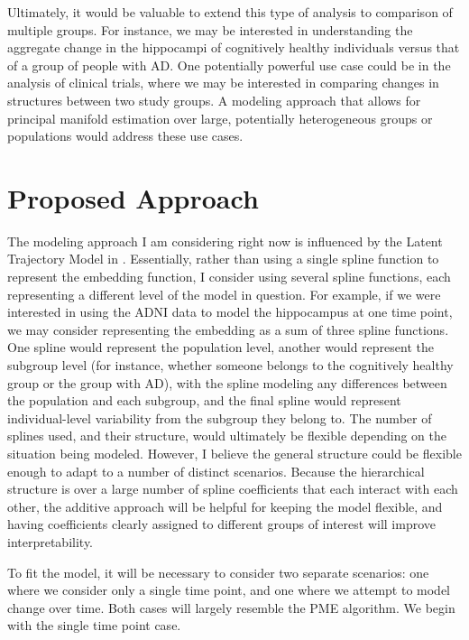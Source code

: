 \documentclass[11pt, reqno]{article}
\begin{document}
Ultimately, it would be valuable to extend this type of analysis to comparison of multiple groups. For instance, we may be interested in understanding the aggregate change in the hippocampi of cognitively healthy individuals versus that of a group of people with AD. One potentially powerful use case could be in the analysis of clinical trials, where we may be interested in comparing changes in structures between two study groups. A modeling approach that allows for principal manifold estimation over large, potentially heterogeneous groups or populations would address these use cases.

\section{Proposed Approach}

The modeling approach I am considering right now is influenced by the Latent Trajectory Model in \cite{schulamIntegrativeAnalysisUsing2016}. Essentially, rather than using a single spline function to represent the embedding function, I consider using several spline functions, each representing a different level of the model in question. For example, if we were interested in using the ADNI data to model the hippocampus at one time point, we may consider representing the embedding as a sum of three spline functions. One spline would represent the population level, another would represent the subgroup level (for instance, whether someone belongs to the cognitively healthy group or the group with AD), with the spline modeling any differences between the population and each subgroup, and the final spline would represent individual-level variability from the subgroup they belong to. The number of splines used, and their structure, would ultimately be flexible depending on the situation being modeled. However, I believe the general structure could be flexible enough to adapt to a number of distinct scenarios. Because the hierarchical structure is over a large number of spline coefficients that each interact with each other, the additive approach will be helpful for keeping the model flexible, and having coefficients clearly assigned to different groups of interest will improve interpretability.

To fit the model, it will be necessary to consider two separate scenarios: one where we consider only a single time point, and one where we attempt to model change over time. Both cases will largely resemble the PME algorithm. We begin with the single time point case.
\end{document}
